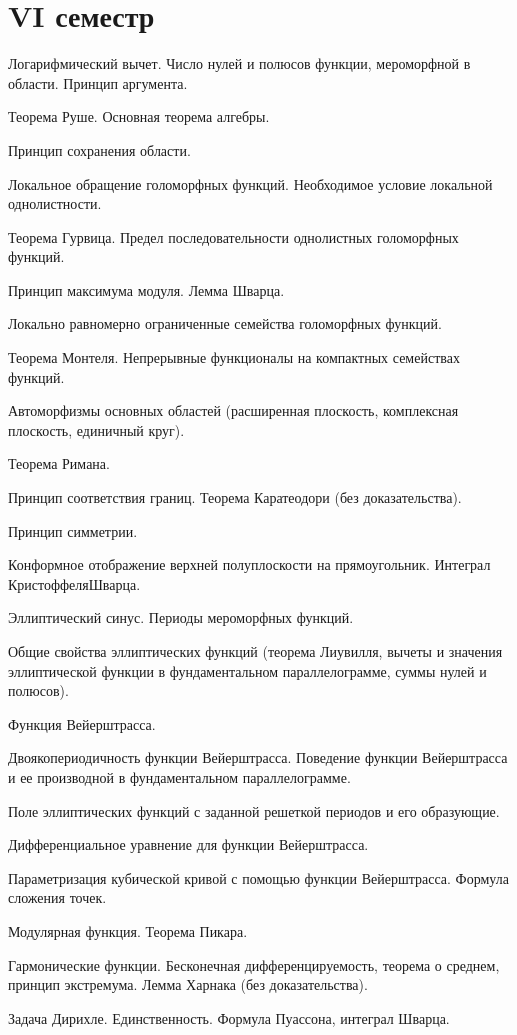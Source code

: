 \documentclass[a4paper]{article}
\begin{document}
\section*{VI семестр}
\begin{nums}{-2}
\item Логарифмический вычет. Число нулей и полюсов функции, мероморфной в
области. Принцип аргумента.
\item Теорема Руше. Основная теорема алгебры.
\item Принцип сохранения области.
\item Локальное обращение голоморфных функций. Необходимое условие локальной
однолистности.
\item Теорема Гурвица. Предел последовательности однолистных голоморфных
функций.
\item Принцип максимума модуля. Лемма Шварца.
\item Локально равномерно ограниченные семейства голоморфных функций.
\item Теорема Монтеля. Непрерывные функционалы на компактных семействах
функций.
\item Автоморфизмы основных областей (расширенная плоскость, комплексная
плоскость, единичный круг).
\item Теорема Римана.
\item Принцип соответствия границ. Теорема Каратеодори (без доказательства).
\item Принцип симметрии.
\item Конформное отображение верхней полуплоскости на прямоугольник. Интеграл
Кристоффеля\ч Шварца.
\item Эллиптический синус. Периоды мероморфных функций.
\item Общие свойства эллиптических функций (теорема Лиувилля, вычеты и
значения эллиптической функции в фундаментальном параллелограмме, суммы
нулей и полюсов).
\item Функция Вейерштрасса.
\item Двоякопериодичность функции Вейерштрасса. Поведение функции Вейерштрасса
и ее производной в фундаментальном параллелограмме.
\item Поле эллиптических функций с заданной решеткой периодов и его
образующие.
\item Дифференциальное уравнение для функции Вейерштрасса.
\item Параметризация кубической кривой с помощью функции Вейерштрасса. Формула
сложения точек.
\item Модулярная функция. Теорема Пикара.
\item Гармонические функции. Бесконечная дифференцируемость, теорема о
среднем, принцип экстремума. Лемма Харнака (без доказательства).
\item Задача Дирихле. Единственность. Формула Пуассона, интеграл Шварца.
\end{nums}

\medskip
\dmvntrail
\end{document}
